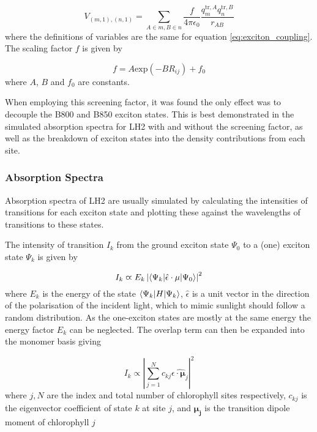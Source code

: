 \begin{equation}
    V_{\left(m, 1\right), \left(n,1\right)} = \sum_{A \in m, B \in n} \frac{f}{4\pi\epsilon_0} \frac{q^{\text{tr},A}_m q^{\text{tr},B}_n}{r_{AB}}
    \label{eq:pc_exciton_coupling}
\end{equation}
%
where the definitions of variables are the same for equation \ref{eq:exciton_coupling}.
The scaling factor $f$ is given by

\begin{equation}
    f = A \text{exp}\left(-B R_{ij}\right) + f_0
\end{equation}
%
where $A$, $B$ and $f_0$ are constants. 

When employing this screening factor, it was found the only effect was to decouple
the B800 and B850 exciton states. This is best demonstrated in the simulated absorption
spectra for LH2 with and without the screening factor, as well as the breakdown 
of exciton states into the density contributions from each site.

\subsubsection{Absorption Spectra}
\label{subsubsec:abs_spec}

Absorption spectra of LH2 are usually simulated by calculating the intensities of 
transitions for each exciton state and plotting these against the wavelengths of
transitions to these states. 

The intensity of transition $I_k$ from the ground exciton state $\Psi_0$ to a (one)
exciton state $\Psi_k$ is given by

\begin{equation}
    I_k \varpropto E_k \left\lvert \braket{\Psi_k| \hat{\epsilon} \cdot \mathbf{\mu} | \Psi_0} \right\rvert^2
\end{equation}
%
where $E_k$ is the energy of the state $\braket{\Psi_k|H|\Psi_k}$, $\hat{\epsilon}$
is a unit vector in the direction of the polarisation of the incident light, which
to mimic sunlight should follow a random distribution. As the one-exciton states 
are mostly at the same energy the energy factor $E_k$ can be neglected. The overlap
term can then be expanded into the monomer basis giving

\begin{equation}
    I_k \varpropto \left\lvert \sum^N_{j=1} c_{kj} \hat{\epsilon \cdot \mathbf{\mu}_j }\right\rvert^2
\end{equation}
%
where $j,N$ are the index and total number of chlorophyll sites respectively, $c_{kj}$
is the eigenvector coefficient of state $k$ at site $j$, and $\mathbf{\mu_j}$ is 
the transition dipole moment of chlorophyll $j$ 

